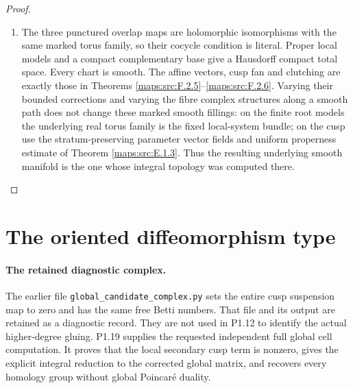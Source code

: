 \begin{proof}
\begin{enumerate}[label=\arabic*.]
The proof of Theorem \ref{maps:src:E.1.2} used only boundedness of $C$,
integrality of the standard cusp, and unimodularity of that
fan.  It therefore proves smoothness, proper discontinuity
and properness for this model without a symmetry condition
on $C$.  Glue by the displayed integral marking and use no
additional cusp translation.

\item The three punctured overlap maps are holomorphic isomorphisms
with the same marked torus family, so their cocycle condition
is literal.  Proper local models and a compact complementary
base give a Hausdorff compact total space.  Every chart is
smooth.  The affine vectors, cusp fan and clutching are exactly
those in Theorems \ref{maps:src:F.2.5}--\ref{maps:src:F.2.6}.  Varying their bounded corrections
and varying the fibre complex structures along a smooth path
does not change these marked smooth fillings: on the finite
root models the underlying real torus family is the fixed
local-system bundle; on the cusp use the stratum-preserving
parameter vector fields and uniform properness estimate of
Theorem \ref{maps:src:E.1.3}.  Thus the resulting underlying smooth manifold
is the one whose integral topology was computed there.

\end{enumerate}
\end{proof}


\section{The oriented diffeomorphism type}

\paragraph{The retained diagnostic complex.}
The earlier file \texttt{global\_candidate\_complex.py} sets the entire
cusp suspension map to zero and has the same free Betti numbers.
That file and its output are retained as a diagnostic record.  They
are not used in P1.12 to identify the actual higher-degree gluing.
P1.19 supplies the requested independent full global cell computation.
It proves that the local secondary cusp term is nonzero, gives the
explicit integral reduction to the corrected global matrix, and
recovers every homology group without global Poincar\'e duality.

